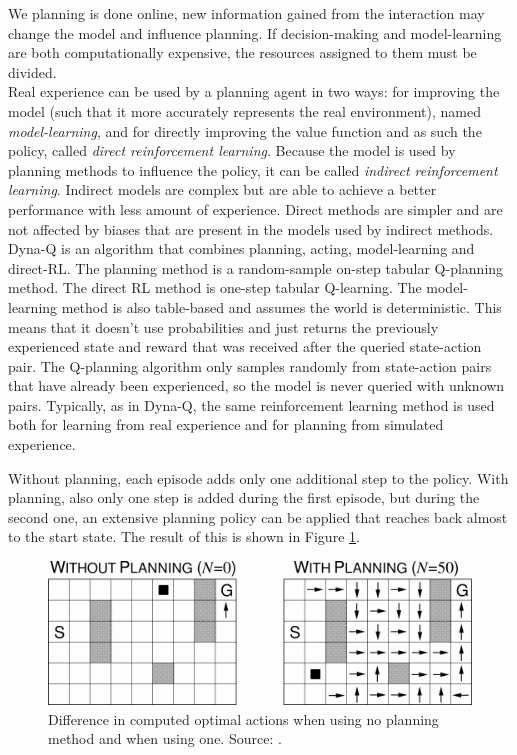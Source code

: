 \documentclass[a4paper]{article}
\begin{document}
We planning is done online, new information gained from the interaction may change the model and influence planning. If decision-making and model-learning are both computationally expensive, the resources assigned to them must be divided.\\
Real experience can be used by a planning agent in two ways: for improving the model (such that it more accurately represents the real environment), named \textit{model-learning}, and for directly improving the value function and as such the policy, called \textit{direct reinforcement learning}. Because the model is used by planning methods to influence the policy, it can be called \textit{indirect reinforcement learning}. Indirect models are complex but are able to achieve a better performance with less amount of experience. Direct methods are simpler and are not affected by biases that are present in the models used by indirect methods.\\
Dyna-Q is an algorithm that combines planning, acting, model-learning and direct-RL. The planning method is a random-sample on-step tabular Q-planning method. The direct RL method is one-step tabular Q-learning. The model-learning method is also table-based and assumes the world is deterministic. This means that it doesn't use probabilities and just returns the previously experienced state and reward that was received after the queried state-action pair. The Q-planning algorithm only samples randomly from state-action pairs that have already been experienced, so the model is never queried with unknown pairs. Typically, as in Dyna-Q, the same reinforcement learning method is used both for learning from real experience and for planning from simulated experience.

Without planning, each episode adds only one additional step to the policy. With planning, also only one step is added during the first episode, but during the second one, an extensive planning policy can be applied that reaches back almost to the start state. The result of this is shown in Figure \ref{fig:withwithoutplanning}.
\begin{figure}[H]
\includegraphics[width=\linewidth]{images/withwithoutplanning.png}
\caption{Difference in computed optimal actions when using no planning method and when using one. Source: \cite{Sutton1998ReinforcementIntroductionb}.}
\label{fig:withwithoutplanning}
\end{figure}
\end{document}
